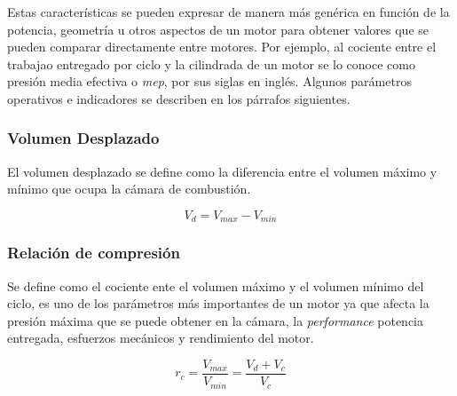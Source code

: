 %
Estas características se pueden expresar de manera más genérica en función de la
potencia, geometría u otros aspectos de un motor para obtener valores que se
pueden comparar directamente entre motores.
%
Por ejemplo, al cociente entre el trabajao entregado por ciclo y la cilindrada
de un motor se lo conoce como presión media efectiva o \emph{mep}, por sus
siglas en inglés.
%
Algunos parámetros operativos e indicadores se describen en los párrafos
siguientes.


\subsubsection{Volumen Desplazado}
%
El volumen desplazado se define como la diferencia entre el volumen máximo y
mínimo que ocupa la cámara de combustión.

\begin{equation}\label{eq:vol_desp} V_d = V_{max}-V_{min}
\end{equation}



\subsubsection{Relación de compresión}

Se define como el cociente ente el volumen máximo y el volumen mínimo del ciclo,
es uno de los parámetros más importantes de un motor ya que afecta la presión
máxima que se puede obtener en la cámara, la \emph{performance} potencia
entregada, esfuerzos mecánicos y rendimiento del motor.

\begin{equation}\label{eq:rel_comp} r_c = \frac{V_{max}}{V_{min}} = \frac{V_d+V_c}{V_c}
\end{equation}



